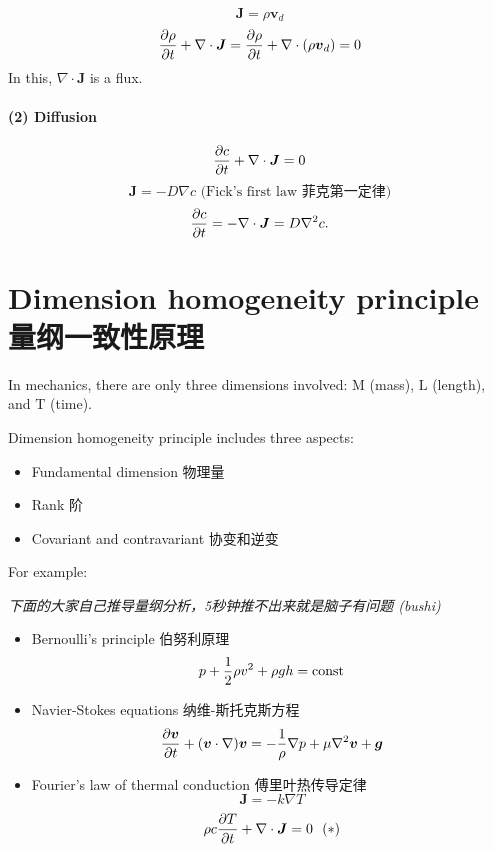 \[\boldsymbol J = \rho \boldsymbol v_d\] \[{\partial \rho \over \partial t} + \nabla \cdot \boldsymbol J = {\partial \rho \over \partial t}+\nabla \cdot (\rho \boldsymbol v_d) = 0\] In this, \(\nabla \cdot \boldsymbol J\) is a flux.

\paragraph{(2) Diffusion}\label{diffusion}

\[{\partial c \over \partial t} + \nabla \cdot \boldsymbol J = 0\] \[\boldsymbol J = - D \nabla c \text{\ \ (Fick's\  first\ law\ 菲克第一定律)}\] \[{\partial c \over \partial t} = - \nabla \cdot \boldsymbol J = D \nabla^2 c.\]

\section{Dimension homogeneity principle 量纲一致性原理}\label{dimension-homogeneity-principle-ux91cfux7eb2ux4e00ux81f4ux6027ux539fux7406}

In mechanics, there are only three dimensions involved: \(\mathrm{M}\) (mass), \(\mathrm{L}\) (length), and \(\mathrm{T}\) (time).

Dimension homogeneity principle includes three aspects: \begin{itemize}
\tightlist{}
\item Fundamental dimension 物理量
\item Rank 阶
\item Covariant and contravariant 协变和逆变
\end{itemize}

For example:

\emph{下面的大家自己推导量纲分析，5秒钟推不出来就是脑子有问题 (bushi)}

\begin{itemize}
\tightlist{}
\item
  Bernoulli's principle 伯努利原理
  \[p + {1 \over 2} \rho v^2 + \rho gh = \mathrm{const}\]
\item
  Navier-Stokes equations 纳维-斯托克斯方程
  \[ {\partial \boldsymbol v \over \partial t} +(\boldsymbol v \cdot \nabla) \boldsymbol v = - {1 \over \rho} \nabla p + \mu \nabla^2 \boldsymbol v + \boldsymbol g\]
\item
  Fourier's law of thermal conduction 傅里叶热传导定律
  \[\boldsymbol J = -k \nabla T\] \[\rho c {\partial T \over \partial t} + \nabla \cdot \boldsymbol J=0 \ \  (*)\]
\end{itemize}

